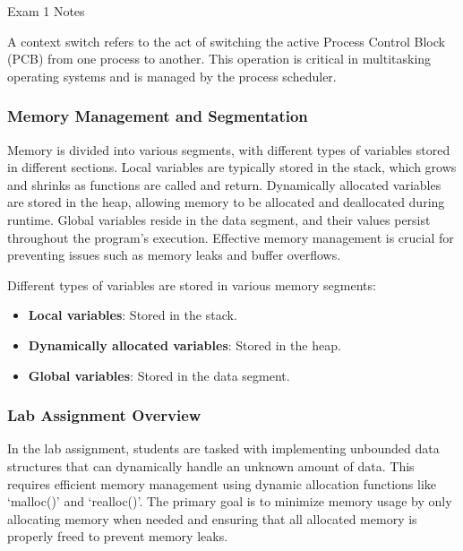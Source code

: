\begin{examnotes}{Exam 1 Notes}
    \begin{highlight}
        A context switch refers to the act of switching the active Process Control Block (PCB) from one process to another. This operation is critical in multitasking operating systems and is managed 
        by the process scheduler.
    \end{highlight}
    
    \subsubsection*{Memory Management and Segmentation}
    
    Memory is divided into various segments, with different types of variables stored in different sections. Local variables are typically stored in the stack, which grows and shrinks as functions are 
    called and return. Dynamically allocated variables are stored in the heap, allowing memory to be allocated and deallocated during runtime. Global variables reside in the data segment, and their 
    values persist throughout the program's execution. Effective memory management is crucial for preventing issues such as memory leaks and buffer overflows.
    
    \begin{highlight}
        Different types of variables are stored in various memory segments:
        \begin{itemize}
            \item \textbf{Local variables}: Stored in the stack.
            \item \textbf{Dynamically allocated variables}: Stored in the heap.
            \item \textbf{Global variables}: Stored in the data segment.
        \end{itemize}
    \end{highlight}
    
    \subsubsection*{Lab Assignment Overview}
    
    In the lab assignment, students are tasked with implementing unbounded data structures that can dynamically handle an unknown amount of data. This requires efficient memory management using dynamic 
    allocation functions like `malloc()' and `realloc()'. The primary goal is to minimize memory usage by only allocating memory when needed and ensuring that all allocated memory is properly freed to 
    prevent memory leaks.
    

\end{examnotes}
